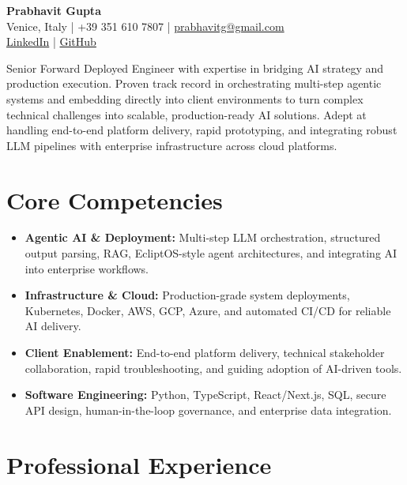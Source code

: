 \documentclass[11pt,a4paper]{article}
\begin{document}
\pagestyle{empty}

\begin{center}
    {\huge \textbf{Prabhavit Gupta}} \\[0.5em]
    Venice, Italy | +39 351 610 7807 | \href{mailto:prabhavitg@gmail.com}{prabhavitg@gmail.com} \\
    \href{https://www.linkedin.com/in/prabhavit/}{LinkedIn} | \href{https://github.com/prab-gupta}{GitHub}
\end{center}

\vspace{1em}

\noindent
Senior Forward Deployed Engineer with expertise in bridging AI strategy and production execution. Proven track record in orchestrating multi-step agentic systems and embedding directly into client environments to turn complex technical challenges into scalable, production-ready AI solutions. Adept at handling end-to-end platform delivery, rapid prototyping, and integrating robust LLM pipelines with enterprise infrastructure across cloud platforms.

\section{Core Competencies}
\begin{itemize}[leftmargin=*,noitemsep]
\item \textbf{Agentic AI \& Deployment:} Multi-step LLM orchestration, structured output parsing, RAG, EcliptOS-style agent architectures, and integrating AI into enterprise workflows.
\item \textbf{Infrastructure \& Cloud:} Production-grade system deployments, Kubernetes, Docker, AWS, GCP, Azure, and automated CI/CD for reliable AI delivery.
\item \textbf{Client Enablement:} End-to-end platform delivery, technical stakeholder collaboration, rapid troubleshooting, and guiding adoption of AI-driven tools.
\item \textbf{Software Engineering:} Python, TypeScript, React/Next.js, SQL, secure API design, human-in-the-loop governance, and enterprise data integration.
\end{itemize}

\section{Professional Experience}
\end{document}
